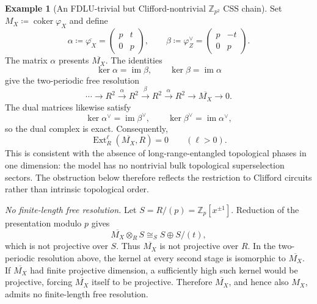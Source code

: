 \documentclass[aps,prx,english,superscriptaddress,twocolumn,tightenlines,showpacs,longbibliography,floatfix,amsfonts]{revtex4-2}
\theoremstyle{remark}
\theoremstyle{definition}
\newtheorem{example}{Example}
\begin{document}
\begin{example}[An FDLU-trivial but Clifford-nontrivial \(\mathbb Z_{p^2}\) CSS chain]
	Set $M_X\coloneqq\operatorname{coker}\varphi_X$ and define
	\begin{equation}
		\alpha\coloneqq\overline{\varphi_X}
		=
		\begin{pmatrix}
			p & t\\
			0 & p
		\end{pmatrix},
		\qquad
		\beta\coloneqq\varphi_Z^\vee
		=
		\begin{pmatrix}
			p & -t\\
			0 & p
		\end{pmatrix}.
	\end{equation}
	The matrix \(\alpha\) presents \(\overline{M_X}\). The identities
	\begin{equation}
		\ker\alpha=\operatorname{im}\beta,
		\qquad
		\ker\beta=\operatorname{im}\alpha
	\end{equation}
	give the two-periodic free resolution
	\begin{equation}
		\cdots\longrightarrow R^2
		\xrightarrow{\alpha}R^2
		\xrightarrow{\beta}R^2
		\xrightarrow{\alpha}R^2
		\longrightarrow \overline{M_X}\longrightarrow0.
	\end{equation}
	The dual matrices likewise satisfy
	\begin{equation}
		\ker\alpha^\vee=\operatorname{im}\beta^\vee,
		\qquad
		\ker\beta^\vee=\operatorname{im}\alpha^\vee,
	\end{equation}
	so the dual complex is exact.
	Consequently,
	\begin{equation}
		\operatorname{Ext}_R^\ell(\overline{M_X},R)=0
		\qquad(\ell>0).
	\end{equation}
	This is consistent with the absence of long-range-entangled
	topological phases in one dimension: the model has no nontrivial bulk
	topological superselection sectors. The obstruction below therefore
	reflects the restriction to Clifford circuits rather than intrinsic
	topological order.

	\emph{No finite-length free resolution.}
	Let $S=R/(p)=\mathbb Z_p[x^{\pm1}]$. Reduction of the presentation
	modulo $p$ gives
	\begin{equation}
		\overline{M_X}\otimes_R S\cong_S S\oplus S/(t),
	\end{equation}
	which is not projective over $S$. Thus \(\overline{M_X}\) is not
	projective over $R$.
	In the two-periodic resolution above, the kernel at every second stage
	is isomorphic to \(\overline{M_X}\). If \(\overline{M_X}\) had finite
	projective dimension, a sufficiently high such kernel would be projective,
	forcing \(\overline{M_X}\) itself to be projective. Therefore
	\(\overline{M_X}\), and hence also \(M_X\), admits no finite-length free
	resolution.


\end{example}
\end{document}
